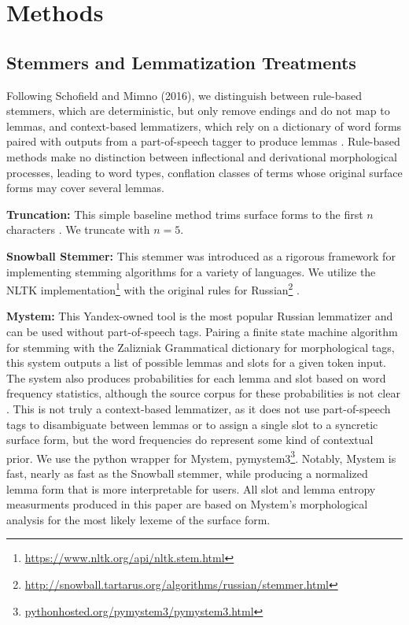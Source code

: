 \documentclass[11pt,a4paper]{article}
\begin{document}
\section{Methods}
\subsection{Stemmers and Lemmatization Treatments}
\label{sec:stemmers}
Following Schofield and Mimno (2016), we distinguish between rule-based stemmers, which are deterministic, but only remove endings and do not map to lemmas, and context-based lemmatizers, which rely on a dictionary of word forms paired with outputs from a part-of-speech tagger to produce lemmas \cite{schofield-mimno-2016-comparing,Sharoff2011ThePP}. Rule-based methods make no distinction between inflectional and derivational morphological processes, leading to word types, conflation classes of terms whose original surface forms may cover several lemmas.

\textbf{Truncation:} This simple baseline method trims surface forms to the first $n$ characters \cite{schofield-mimno-2016-comparing}. We truncate with $n=5$.

\textbf{Snowball Stemmer:} This stemmer was introduced as a rigorous framework for implementing stemming algorithms for a variety of languages. We utilize the NLTK implementation\footnote{\url{https://www.nltk.org/api/nltk.stem.html}} with the original rules for Russian\footnote{\url{http://snowball.tartarus.org/algorithms/russian/stemmer.html}} \cite{snowball}.


\textbf{Mystem:} This Yandex-owned tool is the most popular Russian lemmatizer and can be used without part-of-speech tags. Pairing a finite state machine algorithm for stemming with the Zalizniak Grammatical dictionary for morphological tags, this system outputs a list of possible lemmas and slots for a given token input. The system also produces probabilities for each lemma and slot based on word frequency statistics, although the source corpus for these probabilities is not clear \cite{Segalovich2003AFM}. This is not truly a context-based lemmatizer, as it does not use part-of-speech tags to disambiguate between lemmas or to assign a single slot to a syncretic surface form, but the word frequencies do represent some kind of contextual prior. We use the python wrapper for Mystem, pymystem3\footnote{\url{pythonhosted.org/pymystem3/pymystem3.html}}. Notably, Mystem is fast, nearly as fast as the Snowball stemmer, while producing a normalized lemma form that is more interpretable for users. All slot and lemma entropy measurments produced in this paper are based on Mystem's morphological analysis for the most likely lexeme of the surface form.
\end{document}
